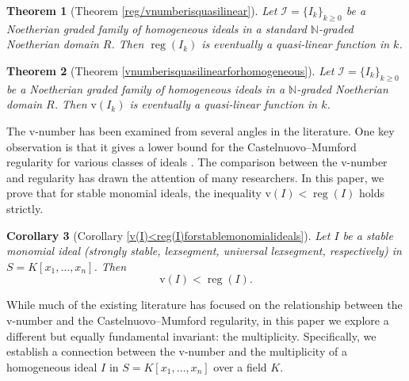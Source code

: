 \documentclass[11pt,reqno,a4paper]{amsart}
\newtheorem{theorem}{Theorem}[section]
\newtheorem{corollary}[theorem]{Corollary}
\theoremstyle{definition}
\begin{document}
\begin{theorem}[Theorem \ref{reg/vnumberisquasilinear}]
    Let $\mathcal{I} = \{ I_k \}_{k \geq 0}$ be a Noetherian graded family of homogeneous ideals in a standard $\mathbb{N}$-graded Noetherian domain $R$. Then $\operatorname{reg}(I_k)$ is eventually a quasi-linear function in $k$.
        
\end{theorem}

\begin{theorem}[Theorem \ref{vnumberisquasilinearforhomogeneous}]
Let \(\mathcal{I} = \{I_k\}_{k \geq 0}\) be a Noetherian graded family of homogeneous ideals in a  $\mathbb{N}$-graded Noetherian domain \(R\). Then \(\mathrm{v}(I_k)\) is eventually a quasi-linear function in \(k\). 

\end{theorem}





The \(\mathrm{v}\)-number has been examined from several angles in the literature. One key observation is that it gives a lower bound for the Castelnuovo–Mumford regularity for various classes of ideals \cite{VanmathiSarkar25, AmbhoreSahaSengupta24,BiswasMandal24,Ficarra26,FicarraMarques25,JaramilloVillarreal21, KumarNanduriSaha25, Saha24, SahaSengupta22}. The comparison between the \(\mathrm{v}\)-number and regularity has drawn the attention of many researchers. In this paper, we prove that for stable monomial ideals, the inequality \(\mathrm{v}(I) < \operatorname{reg}(I)\) holds strictly.

\begin{corollary}[Corollary \ref{v(I)<reg(I)forstablemonomialideals}]


Let $I$ be a stable monomial ideal (strongly stable, lexsegment, universal lexsegment, respectively) in $S = K[x_1, \dots, x_n]$. Then \[\mathrm{v}(I) < \operatorname{reg}(I).\]



\end{corollary}

\noindent While much of the existing literature has focused on the relationship between the v-number and the Castelnuovo–Mumford regularity, in this paper we explore a different but equally fundamental invariant: the multiplicity. Specifically, we establish a connection between the v-number and the  multiplicity of a homogeneous ideal \(I\) in  \(S = K[x_1, \ldots, x_n]\) over a field \(K\).
\end{document}
